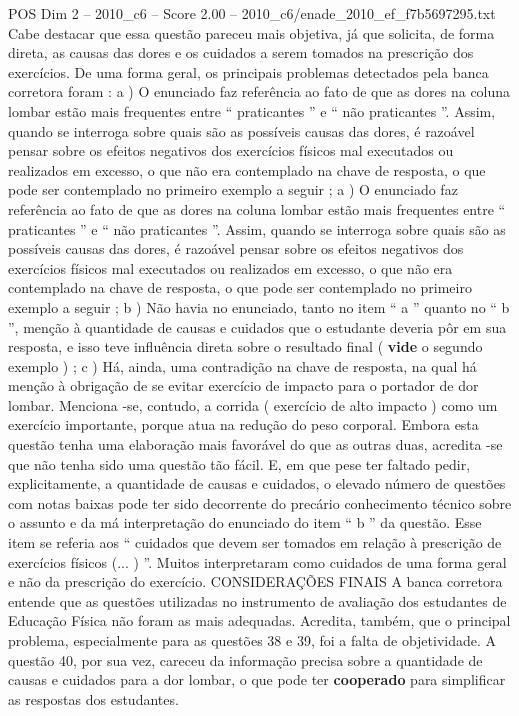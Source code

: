 \begin{textsample}{POS Dim 2 – 2010\_c6 – Score 2.00 – 2010\_c6/enade\_2010\_ef\_f7b5697295.txt}
Cabe destacar que essa questão pareceu mais objetiva, já que solicita, de forma direta, as causas das dores e os cuidados a serem tomados na prescrição dos exercícios.
De uma forma geral, os principais problemas detectados pela banca corretora foram : a ) O enunciado faz referência ao fato de que as dores na coluna lombar estão mais frequentes entre “ praticantes ” e “ não praticantes ”.
Assim, quando se interroga sobre quais são as possíveis causas das dores, é razoável pensar sobre os efeitos negativos dos exercícios físicos mal executados ou realizados em excesso, o que não era contemplado na chave de resposta, o que pode ser contemplado no primeiro exemplo a seguir ; a ) O enunciado faz referência ao fato de que as dores na coluna lombar estão mais frequentes entre “ praticantes ” e “ não praticantes ”.
Assim, quando se interroga sobre quais são as possíveis causas das dores, é razoável pensar sobre os efeitos negativos dos exercícios físicos mal executados ou realizados em excesso, o que não era contemplado na chave de resposta, o que pode ser contemplado no primeiro exemplo a seguir ; b ) Não havia no enunciado, tanto no item “ a ” quanto no “ b ”, menção à quantidade de causas e cuidados que o estudante deveria pôr em sua resposta, e isso teve influência direta sobre o resultado final ( \textbf{vide} o segundo exemplo ) ; c ) Há, ainda, uma contradição na chave de resposta, na qual há menção à obrigação de se evitar exercício de impacto para o portador de dor lombar.
Menciona -se, contudo, a corrida ( exercício de alto impacto ) como um exercício importante, porque atua na redução do peso corporal.
Embora esta questão tenha uma elaboração mais favorável do que as outras duas, acredita -se que não tenha sido uma questão tão fácil.
E, em que pese ter faltado pedir, explicitamente, a quantidade de causas e cuidados, o elevado número de questões com notas baixas pode ter sido decorrente do precário conhecimento técnico sobre o assunto e da má interpretação do enunciado do item “ b ” da questão.
Esse item se referia aos “ cuidados que devem ser tomados em relação à prescrição de exercícios físicos (... ) ”.
Muitos interpretaram como cuidados de uma forma geral e não da prescrição do exercício.
CONSIDERAÇÕES FINAIS A banca corretora entende que as questões utilizadas no instrumento de avaliação dos estudantes de Educação Física não foram as mais adequadas.
Acredita, também, que o principal problema, especialmente para as questões 38 e 39, foi a falta de objetividade.
A questão 40, por sua vez, careceu da informação precisa sobre a quantidade de causas e cuidados para a dor lombar, o que pode ter \textbf{cooperado} para simplificar as respostas dos estudantes.

\end{textsample}
